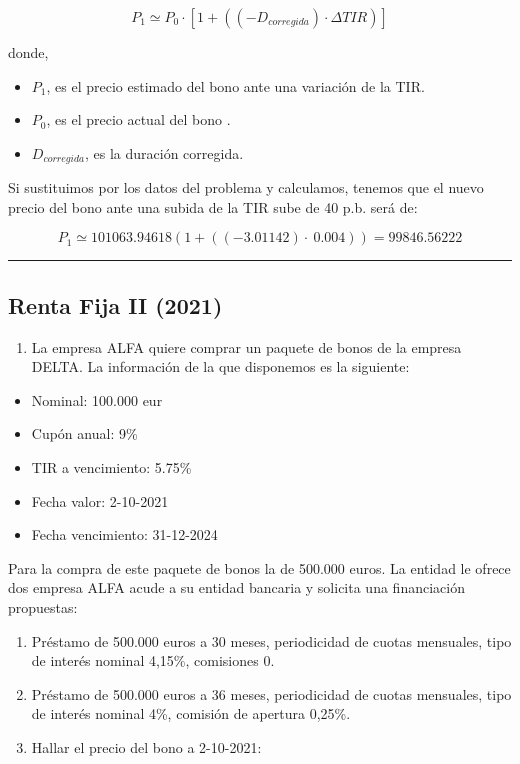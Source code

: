 \documentclass[
  letterpaper,
  DIV=11,
  numbers=noendperiod]{scrreprt}
\providecommand{\tightlist}{%
  \setlength{\itemsep}{0pt}\setlength{\parskip}{0pt}}\usepackage{longtable,booktabs,array}
\begin{document}
\begin{tcolorbox}
\begin{tcolorbox}
\[P_1\simeq P_0\cdot\left[1+((-D_{corregida})\cdot\Delta TIR)\right]\]

donde,

\begin{itemize}
\item
  \(P_1\), es el precio estimado del bono ante una variación de la TIR.
\item
  \(P_0\), es el precio actual del bono .
\item
  \(D_{corregida}\), es la duración corregida.
\end{itemize}

Si sustituimos por los datos del problema y calculamos, tenemos que el
nuevo precio del bono ante una subida de la TIR sube de 40 p.b. será de:

\[P_1\simeq 101063.94618\left(1+\left(\left(-3.01142\right)\cdot \:0.004\right)\right)=99846.56222\]

\end{tcolorbox}

\begin{center}\rule{0.5\linewidth}{0.5pt}\end{center}

\subsection{Renta Fija II (2021)}\label{renta-fija-ii-2021-1}

\begin{enumerate}
\def\labelenumi{\arabic{enumi}.}
\tightlist
\item
  La empresa ALFA quiere comprar un paquete de bonos de la empresa
  DELTA. La información de la que disponemos es la siguiente:
\end{enumerate}

\begin{itemize}
\item
  Nominal: 100.000 eur
\item
  Cupón anual: 9\%
\item
  TIR a vencimiento: 5.75\%
\item
  Fecha valor: 2-10-2021
\item
  Fecha vencimiento: 31-12-2024
\end{itemize}

Para la compra de este paquete de bonos la de 500.000 euros. La entidad
le ofrece dos empresa ALFA acude a su entidad bancaria y solicita una
financiación propuestas:

\begin{enumerate}
\def\labelenumi{\arabic{enumi}.}
\item
  Préstamo de 500.000 euros a 30 meses, periodicidad de cuotas
  mensuales, tipo de interés nominal 4,15\%, comisiones 0.
\item
  Préstamo de 500.000 euros a 36 meses, periodicidad de cuotas
  mensuales, tipo de interés nominal 4\%, comisión de apertura 0,25\%.
\item
  Hallar el precio del bono a 2-10-2021:
\end{enumerate}


\end{tcolorbox}
\end{document}
